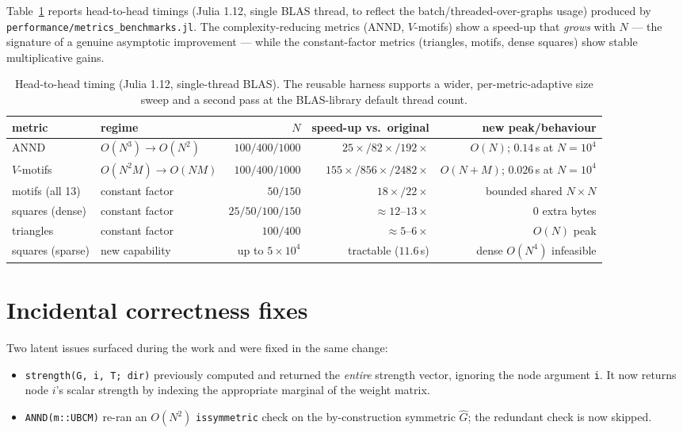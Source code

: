 \documentclass[11pt]{article}
\theoremstyle{plain}
\theoremstyle{definition}
\newcommand{\Ghat}{\hat{G}}
\begin{document}
Table~\ref{tab:bench} reports head-to-head timings (Julia 1.12, single BLAS thread, to reflect the
batch/threaded-over-graphs usage) produced by \texttt{performance/metrics\_benchmarks.jl}. The
complexity-reducing metrics (ANND, $V$-motifs) show a speed-up that \emph{grows} with $N$ --- the signature of
a genuine asymptotic improvement --- while the constant-factor metrics (triangles, motifs, dense squares)
show stable multiplicative gains.

\begin{table}[t]
\centering
\footnotesize
\begin{tabular}{llrrr}
\toprule
metric & regime & $N$ & speed-up vs.\ original & new peak/behaviour \\
\midrule
ANND                & $O(N^3)\!\to\!O(N^2)$ & $100/400/1000$ & $25\times/82\times/192\times$ & $O(N)$; $0.14$\,s at $N{=}10^4$ \\
$V$-motifs          & $O(N^2M)\!\to\!O(NM)$ & $100/400/1000$ & $155\times/856\times/2482\times$ & $O(N{+}M)$; $0.026$\,s at $N{=}10^4$ \\
motifs (all 13)     & constant factor       & $50/150$        & $18\times/22\times$          & bounded shared $N\times N$ \\
squares (dense)     & constant factor       & $25/50/100/150$ & $\approx 12\text{--}13\times$ & $0$ extra bytes \\
triangles           & constant factor       & $100/400$       & $\approx 5\text{--}6\times$   & $O(N)$ peak \\
squares (sparse)    & new capability        & up to $5\!\times\!10^4$ & tractable ($11.6$\,s) & dense $O(N^4)$ infeasible \\
\bottomrule
\end{tabular}
\caption{Head-to-head timing (Julia 1.12, single-thread BLAS). The reusable harness supports a wider,
per-metric-adaptive size sweep and a second pass at the BLAS-library default thread count.}
\label{tab:bench}
\end{table}

\section{Incidental correctness fixes}
\label{sec:fixes}
Two latent issues surfaced during the work and were fixed in the same change:
\begin{itemize}
  \item \texttt{strength(G, i, T; dir)} previously computed and returned the \emph{entire} strength vector,
  ignoring the node argument \texttt{i}. It now returns node $i$'s scalar strength by indexing the
  appropriate marginal of the weight matrix.
  \item \texttt{ANND(m::UBCM)} re-ran an $O(N^2)$ \texttt{issymmetric} check on the by-construction symmetric
  $\Ghat$; the redundant check is now skipped.
\end{itemize}
\end{document}
